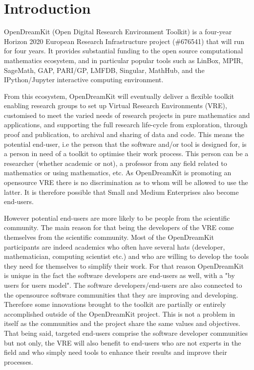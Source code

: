 \documentclass{deliverablereport}
\author{Nicolas M. Thiéry, Benoît Pilorget}
\begin{document}
\enlargethispage{4ex}
\maketitle
\githubissuedescription
\tableofcontents\newpage


\section{Introduction}

OpenDreamKit (Open Digital Research Environment Toolkit) is a four-year Horizon 2020 European Research Infrastructure project (\#676541) that will run for four years. It provides substantial funding to the open source computational mathematics ecosystem, and in particular popular tools such as LinBox, MPIR, SageMath, GAP, PARI/GP, LMFDB, Singular, MathHub, and the IPython/Jupyter interactive computing environment.

From this ecosystem, OpenDreamKit will eventually deliver a flexible toolkit enabling research groups to set up Virtual Research Environments (VRE), customised to meet the varied needs of research projects in pure mathematics and applications, and supporting the full research life-cycle from exploration, through proof and publication, to archival and sharing of data and code. 
This means the potential end-user, i.e the person that the software and/or tool is designed for, is a person in need of a toolkit to optimise their work process. This person can be a researcher (whether academic or not), a professor from any field related to mathematics or using mathematics, etc. As OpenDreamKit is promoting an opensource VRE there is no discrimination as to whom will be allowed to use the latter. It is therefore possible that Small and Medium Enterprises also become end-users.

However potential end-users are more likely to be people from the scientific community. The main reason for that being the developers of the VRE come themselves from the scientific community. Most of the OpenDreamKit participants are indeed academics who often have several hats (developer, mathematician, computing scientist etc.) and who are willing to develop the tools they need for themselves to simplify their work. For that reason OpenDreamKit is unique in the fact the software developers are end-users as well, with a "by users for users model". The software developers/end-users are also connected to the opensource software communities that they are improving and developing. Therefore some innovations brought to the toolkit are partially or entirely accomplished outside of the OpenDreamKit project. This is not a problem in itself as the communities and the project share the same values and objectives.
That being said, targeted end-users comprise the software developer communities but not only, the VRE will also benefit to end-users who are not experts in the field and who simply need tools to enhance their results and improve their processes.
\end{document}
